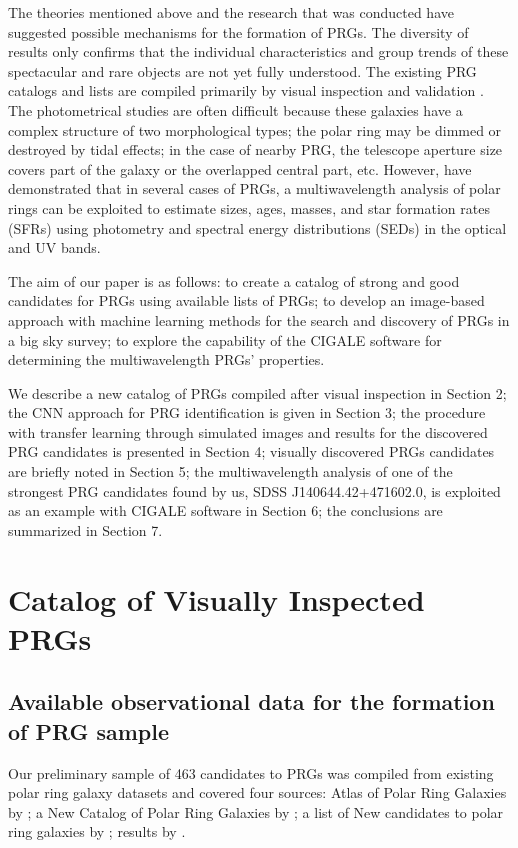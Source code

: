 \documentclass{aa}
\begin{document}
The theories mentioned above and the research that was conducted have suggested possible mechanisms for the formation of PRGs. The diversity of results only confirms that the individual characteristics and group trends of these spectacular and rare objects are not yet fully understood. The existing PRG catalogs and lists are compiled primarily by visual inspection and validation \citep{Whitmore1990, Moiseev2011, Reshetnikov2019}. The photometrical studies are often difficult because these galaxies have a complex structure of two morphological types; the polar ring may be dimmed or destroyed by tidal effects; in the case of nearby PRG, the telescope aperture size covers part of the galaxy or the overlapped central part, etc. However, \cite{Lackey2023, Lackey2024} have demonstrated that in several cases of PRGs, a multiwavelength analysis of polar rings can be exploited to estimate sizes, ages, masses, and star formation rates (SFRs) using photometry and spectral energy distributions (SEDs) in the optical and UV bands. 

The aim of our paper is as follows: to create a catalog of strong and good candidates for PRGs using available lists of PRGs; to develop an image-based approach with machine learning methods for the search and discovery of PRGs in a big sky survey; to explore the capability of the CIGALE software for determining the multiwavelength PRGs' properties. 

We describe a new catalog of PRGs compiled after visual inspection in Section 2; the CNN approach for PRG identification is given in Section 3; the procedure with transfer learning through simulated images and results for the discovered PRG candidates is presented in Section 4; visually discovered PRGs candidates are briefly noted in Section 5; the multiwavelength analysis of one of the strongest PRG candidates found by us, SDSS J140644.42+471602.0, is exploited as an example with CIGALE software in Section 6; the conclusions are summarized in Section 7. 

\section{Catalog of Visually Inspected PRGs}
\noindent
\subsection{Available observational data for the formation of PRG sample}

Our preliminary sample of 463 candidates to PRGs was compiled from existing polar ring galaxy datasets and covered four sources: Atlas of Polar Ring Galaxies by \cite{Whitmore1990}; a New Catalog of Polar Ring Galaxies by \cite{Moiseev2011}; a list of New candidates to polar ring galaxies by \cite{Reshetnikov2019}; results by \cite{Skryabina2024}.
\end{document}
